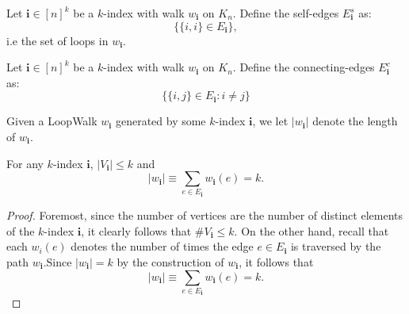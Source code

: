 \begin{definition}
  \label{def:graph_self_edges}
  \leanok
  Let $\mathbf{i} \in[n]^k$ be a $k$-index with walk $w_{\mathbf{i}}$ on $K_n$. Define the
  self-edges
  $E_{\mathbf{i}}^{s}$ as:
  $$
  \{\{i, i\} \in E_{\mathbf{i}}\},
  $$
  i.e the set of loops in $w_{\mathbf{i}}$.
\end{definition}


\begin{definition}
  \label{def:graph_connecting_edges}
  \leanok
  Let $\mathbf{i} \in[n]^k$ be a $k$-index with walk $w_{\mathbf{i}}$ on $K_n$. Define the
  connecting-edges $E_{\mathbf{i}}^{c}$ as:
  $$
  \{\{i, j\} \in E_{\mathbf{i}} : i \neq j\}
  $$
\end{definition}


\begin{definition}
  \label{def:length_of_w_i}
  \leanok
  Given a LoopWalk $w_\mathbf{i}$ generated by some $k$-index $\mathbf{i}$, we let $|w_\mathbf{i}|$
  denote the length of $w_\mathbf{i}$.
\end{definition}


\begin{lemma}[$|w_\mathbf{i}| = k$ : R-1-2 : lem:abs\_w\_i\_eq\_k]
  \label{lem:abs_w_i_eq_k}
  \leanok
  For any $k$-index $\mathbf{i}$, $|V_\mathbf{i}| \leq k$ and
  \[
  |w_\mathbf{i}| \equiv \sum_{e \in E_\mathbf{i}} w_\mathbf{i}(e) = k.
  \]
\end{lemma}

\begin{proof}
  Foremost, since the number of vertices
  are the number of distinct elements of the $k$-index $\mathbf{i}$, it clearly follows that $\#V_\mathbf{i} \leq k$.
  On the other hand, recall that each $w_i(e)$ denotes the number of times the edge $e \in E_\mathbf{i}$
  is traversed by the path $w_\mathbf{i}$.Since $|w_\mathbf{i}| = k$ by the construction of $w_\mathbf{i}$, it follows that
  \[
  |w_\mathbf{i}| \equiv \sum_{e \in E_\mathbf{i}} w_\mathbf{i}(e) = k.
  \]
\end{proof}


